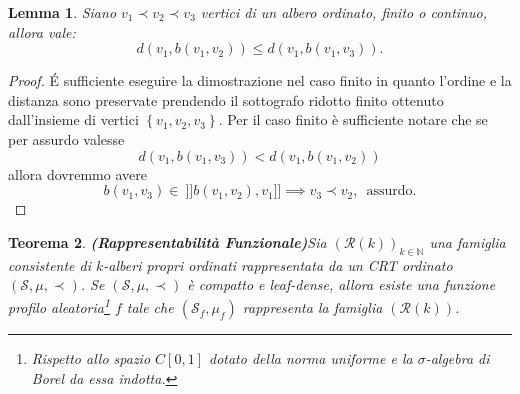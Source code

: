 \documentclass[11pt, twoside]{report}
\newcommand{\Ss}{\mathscr{S}}
\newcommand{\Rr}{\mathscr{R}}
\theoremstyle{definition}
\theoremstyle{plain}
\newtheorem{teo}{Teorema}[chapter]
\newtheorem{lemma}[teo]{Lemma}
\theoremstyle{remark}
\numberwithin{equation}{chapter}
\begin{document}
\begin{lemma}\label{lem_ordered_ineq}
Siano $v_1\prec v_2 \prec v_3$ vertici di un albero ordinato, finito o continuo, allora vale:
$$d\left(v_1, b(v_1,v_2)\right)\leq d\left(v_1, b(v_1,v_3)\right).$$ 
\end{lemma}
\begin{proof}
\'E sufficiente eseguire la dimostrazione nel caso finito in quanto l'ordine e la distanza sono preservate prendendo il sottografo ridotto finito ottenuto dall'insieme di vertici $\left\{v_1, v_2, v_3\right\}$. Per il caso finito è sufficiente notare che se per assurdo valesse 
$$d\left(v_1, b(v_1,v_3)\right)<d\left(v_1, b(v_1,v_2)\right)$$
allora dovremmo avere 
$$b(v_1,v_3)\in \ ]]b(v_1,v_2), v_1]] \implies v_3\prec v_2, \, \text{ assurdo.}$$
\end{proof}

\begin{teo}{\textbf{(Rappresentabilità Funzionale)}}\label{teo_rapp_funzio}
Sia $\left(\Rr(k)\right)_{k\in\mathbb{N}}$ una famiglia consistente di $k$-alberi propri ordinati rappresentata da un CRT ordinato $\left(\Ss, \mu, \prec\right)$. Se $\left(\Ss, \mu, \prec\right)$ è compatto e leaf-dense, allora esiste una funzione profilo aleatoria\footnote{Rispetto allo spazio $C[0,1]$ dotato della norma uniforme e la $\sigma$-algebra di Borel da essa indotta.} $f$ tale che $(\Ss_f, \mu_f)$ rappresenta la famiglia $(\Rr(k))$.
\end{teo}
\end{document}
